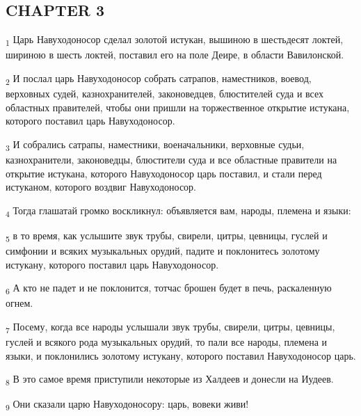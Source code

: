\subsection{CHAPTER 3}
\begin{tcolorbox}
\textsubscript{1} Царь Навуходоносор сделал золотой истукан, вышиною в шестьдесят локтей, шириною в шесть локтей, поставил его на поле Деире, в области Вавилонской.
\end{tcolorbox}
\begin{tcolorbox}
\textsubscript{2} И послал царь Навуходоносор собрать сатрапов, наместников, воевод, верховных судей, казнохранителей, законоведцев, блюстителей суда и всех областных правителей, чтобы они пришли на торжественное открытие истукана, которого поставил царь Навуходоносор.
\end{tcolorbox}
\begin{tcolorbox}
\textsubscript{3} И собрались сатрапы, наместники, военачальники, верховные судьи, казнохранители, законоведцы, блюстители суда и все областные правители на открытие истукана, которого Навуходоносор царь поставил, и стали перед истуканом, которого воздвиг Навуходоносор.
\end{tcolorbox}
\begin{tcolorbox}
\textsubscript{4} Тогда глашатай громко воскликнул: объявляется вам, народы, племена и языки:
\end{tcolorbox}
\begin{tcolorbox}
\textsubscript{5} в то время, как услышите звук трубы, свирели, цитры, цевницы, гуслей и симфонии и всяких музыкальных орудий, падите и поклонитесь золотому истукану, которого поставил царь Навуходоносор.
\end{tcolorbox}
\begin{tcolorbox}
\textsubscript{6} А кто не падет и не поклонится, тотчас брошен будет в печь, раскаленную огнем.
\end{tcolorbox}
\begin{tcolorbox}
\textsubscript{7} Посему, когда все народы услышали звук трубы, свирели, цитры, цевницы, гуслей и всякого рода музыкальных орудий, то пали все народы, племена и языки, и поклонились золотому истукану, которого поставил Навуходоносор царь.
\end{tcolorbox}
\begin{tcolorbox}
\textsubscript{8} В это самое время приступили некоторые из Халдеев и донесли на Иудеев.
\end{tcolorbox}
\begin{tcolorbox}
\textsubscript{9} Они сказали царю Навуходоносору: царь, вовеки живи!
\end{tcolorbox}
